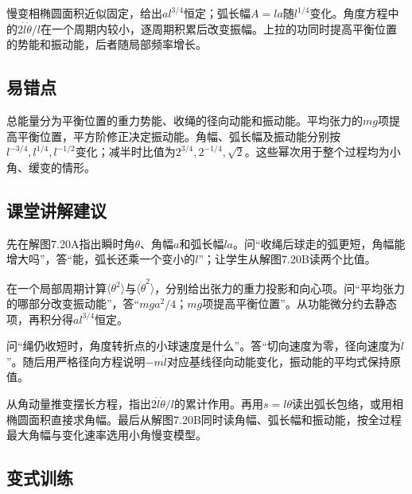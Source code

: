 \documentclass[UTF8,fontset=fandol,a4paper,11pt]{ctexart}
\begin{document}
慢变相椭圆面积近似固定，给出$al^{3/4}$恒定；弧长幅$A=la$随$l^{1/4}$变化。角度方程中的$2\dot l\dot\theta/l$在一个周期内较小，逐周期积累后改变振幅。上拉的功同时提高平衡位置的势能和振动能，后者随局部频率增长。




\subsection*{易错点}

总能量分为平衡位置的重力势能、收绳的径向动能和振动能。平均张力的$mg$项提高平衡位置，平方阶修正决定振动能。角幅、弧长幅及振动能分别按$l^{-3/4},l^{1/4},l^{-1/2}$变化；减半时比值为$2^{3/4},2^{-1/4},\sqrt2$。这些幂次用于整个过程均为小角、缓变的情形。




\subsection*{课堂讲解建议}

先在解图7.20A指出瞬时角$\theta$、角幅$a$和弧长幅$la$。问“收绳后球走的弧更短，角幅能增大吗”，答“能，弧长还乘一个变小的$l$”；让学生从解图7.20B读两个比值。

在一个局部周期计算$\langle\theta^2\rangle$与$\langle\dot\theta^2\rangle$，分别给出张力的重力投影和向心项。问“平均张力的哪部分改变振动能”，答“$mga^2/4$；$mg$项提高平衡位置”。从功能微分约去静态项，再积分得$al^{3/4}$恒定。

问“绳仍收短时，角度转折点的小球速度是什么”。答“切向速度为零，径向速度为$\dot l$”。随后用严格径向方程说明$-m\ddot l$对应基线径向动能变化，振动能的平均式保持原值。

从角动量推变摆长方程，指出$2\dot l\dot\theta/l$的累计作用。再用$s=l\theta$读出弧长包络，或用相椭圆面积直接求角幅。最后从解图7.20B同时读角幅、弧长幅和振动能，按全过程最大角幅与变化速率选用小角慢变模型。



\subsection*{变式训练}
\end{document}
